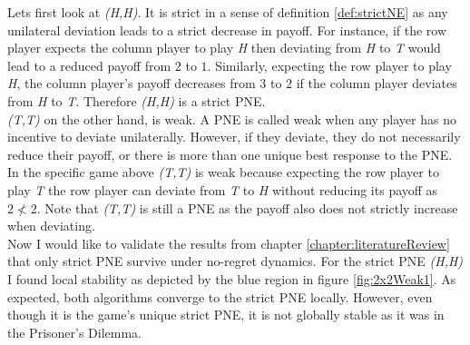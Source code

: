 Lets first look at \textit{(H,H)}. It is strict in a sense of definition \ref{def:strictNE} as any unilateral deviation leads to a strict decrease in payoff. For instance, if the row player expects the column player to play \textit{H} then deviating from \textit{H} to \textit{T} would lead to a reduced payoff from $2$ to $1$. Similarly, expecting the row player to play \textit{H}, the column player's payoff decreases from $3$ to $2$ if the column player deviates from \textit{H} to \textit{T}. Therefore \textit{(H,H)} is a strict PNE. \\

\textit{(T,T)} on the other hand, is weak. A PNE is called weak when any player has no incentive to deviate unilaterally. However, if they deviate, they do not necessarily reduce their payoff, or there is more than one unique best response to the PNE. In the specific game above \textit{(T,T)} is weak because expecting the row player to play \textit{T} the row player can deviate from \textit{T} to \textit{H} without reducing its payoff as $2 \nless 2$. Note that \textit{(T,T)} is still a PNE as the payoff also does not strictly increase when deviating. \\

Now I would like to validate the results from chapter \ref{chapter:literatureReview} that only strict PNE survive under no-regret dynamics. For the strict PNE \textit{(H,H)} I found local stability as depicted by the blue region in figure \ref{fig:2x2Weak1}. As expected, both algorithms converge to the strict PNE locally. However, even though it is the game's unique strict PNE, it is not globally stable as it was in the Prisoner's Dilemma. 

